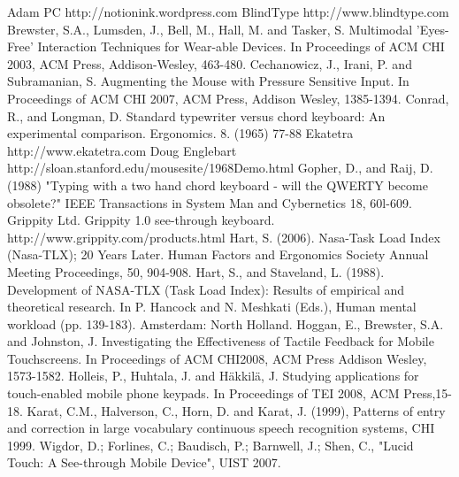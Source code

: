 \documentclass{chi2011}
\begin{document}












\begin{thebibliography}{9}
 Adam PC http://notionink.wordpress.com
 BlindType http://www.blindtype.com
 Brewster, S.A., Lumsden, J., Bell, M., Hall, M. and Tasker, S. Multimodal 'Eyes-Free' Interaction Techniques for Wear-able Devices. In Proceedings of ACM CHI 2003, ACM Press, Addison-Wesley, 463-480.
 Cechanowicz, J., Irani, P. and Subramanian, S. Augmenting the Mouse with Pressure Sensitive Input. In Proceedings of ACM CHI 2007, ACM Press, Addison Wesley, 1385-1394.
 Conrad, R., and Longman, D. Standard typewriter versus chord keyboard: An experimental comparison. Ergonomics. 8. (1965) 77-88
 Ekatetra http://www.ekatetra.com
 Doug Englebart http://sloan.stanford.edu/mousesite/1968Demo.html
 Gopher, D., and Raij, D. (1988) "Typing with a two hand chord keyboard - will the QWERTY become obsolete?" IEEE Transactions in System Man and Cybernetics 18, 60l-609. 
 Grippity Ltd. Grippity 1.0 see-through keyboard. http://www.grippity.com/products.html  
 Hart, S. (2006). Nasa-Task Load Index (Nasa-TLX); 20 Years Later. Human Factors and Ergonomics Society Annual Meeting Proceedings, 50, 904-908.
 Hart, S., and Staveland, L. (1988). Development of NASA-TLX (Task Load Index): Results of empirical and theoretical research. In P. Hancock and N. Meshkati (Eds.), Human mental workload (pp. 139-183). Amsterdam: North Holland.
 Hoggan, E., Brewster, S.A. and Johnston, J. Investigating the Effectiveness of Tactile Feedback for Mobile Touchscreens. In Proceedings of ACM CHI2008, ACM Press Addison Wesley, 1573-1582.
 Holleis, P., Huhtala, J. and Häkkilä, J. Studying applications for touch-enabled mobile phone keypads. In Proceedings of TEI 2008, ACM Press,15-18.
 Karat, C.M., Halverson, C., Horn, D. and Karat, J. (1999), Patterns of entry and correction in large vocabulary continuous speech recognition systems, CHI 1999.
 Wigdor, D.; Forlines, C.; Baudisch, P.; Barnwell, J.; Shen, C., "Lucid Touch: A See-through Mobile Device", UIST 2007.

\end{thebibliography}
\end{document}
